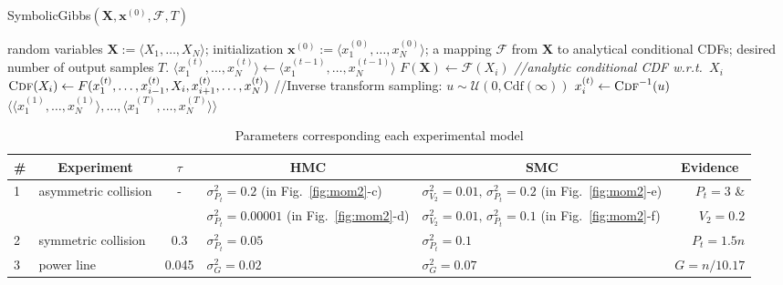 \documentclass[]{article}
\newcommand{\tuple}[1] {\langle #1 \rangle}
\newcommand{\bvec}[1]{\textbf{#1}}
\begin{document}
\begin{algorithm}[hb!]%
\caption{{\sc SymbolicGibbs}$(\bvec{X}, \bvec{x}^{(0)}, \mathcal{F}, T)$  
\label{alg:symbolic-gibbs}}
\begin{algorithmic}
{\small random variables $\bvec{X} := \tuple{X_1, \ldots, X_N}$;
initialization 
 $\bvec{x}^{(0)} := \tuple{x_1^{(0)}, \ldots, x_N^{(0)}}$; 
a mapping $\mathcal{F}$ from $\bvec{X}$	to analytical conditional CDFs;
desired number of output samples $T$.
}
{\small
	 \STATE $\tuple{x_1^{(t)}, \ldots, x_N^{(t)}} \leftarrow \tuple{x_1^{(t-1)}, \ldots, x_N^{(t-1)}}$    
	\FOR{ {\bf each} $X_i \in \bvec{X}$}
		\STATE $F(\bvec{X}) \leftarrow \mathcal{F}(X_i)$ \emph{\hspace*{\fill}//analytic conditional CDF w.r.t.\ $X_i$}
		\STATE 	$\textsc{Cdf}(X_i) \leftarrow F(x_1^{(t)}, \ldots, x_{i-1}^{(t)}, X_i, x_{i+1}^{(t)}, \ldots, x_N^{(t)})$ 
        \vspace{1mm}
		\STATE //Inverse transform sampling:%
		\STATE $u \sim \mathcal{U}(0, \text{Cdf}(\infty))$
		\STATE $x_i^{(t)} \leftarrow \textsc{Cdf}^{-1}(u)$
	\ENDFOR %
\ENDFOR %
 {$\big\langle
			\tuple{x_1^{(1)}, \ldots, x_N^{(1)}}, \ldots, 
			\tuple{x_1^{(T)}, \ldots, x_N^{(T)}}
		\big\rangle$}\;
%	
} %
\end{algorithmic}
\end{algorithm}

\begin{table}[t]
\footnotesize
\caption{Parameters corresponding each experimental model}
\label{t:parameters}
\centering
\begin{tabular}{l l c l l r}
\toprule
\# &\multicolumn{1}{c}{Experiment}  &\multicolumn{1}{c}{$\tau$} &\multicolumn{1}{c}{HMC} &\multicolumn{1}{c}{SMC} &\multicolumn{1}{c}{Evidence}\\
\midrule
1 & asymmetric collision		& -   & $\sigma^2_{P_t} = 0.2$         (in Fig.~\ref{fig:mom2}-c)         & $\sigma^2_{V_2} = 0.01, \, \sigma^2_{P_t} = 0.2$ (in Fig.~\ref{fig:mom2}-e) &$P_t = 3$ \& \\
   &			   & 	   & $\sigma^2_{P_t} = 0.00001$ (in Fig.~\ref{fig:mom2}-d)         & $\sigma^2_{V_2} = 0.01, \, \sigma^2_{P_t} = 0.1$ (in Fig.~\ref{fig:mom2}-f) & $V_2 = 0.2$\\
2 & symmetric collision 		& 0.3     & $\sigma^2_{P_t} = 0.05$ & $\sigma^2_{P_t} = 0.1$ & $P_t = 1.5n$\\
3 & power line				& 0.045 & $\sigma^2_{G} = 0.02$    &$\sigma^2_{G} = 0.07$   & $G = n/10.17$ \\
\bottomrule
\end{tabular}
\end{table}
\end{document}
